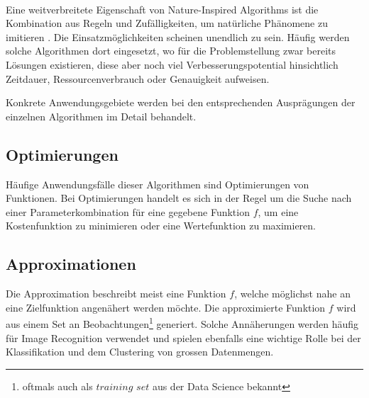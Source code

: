 \cite[Kap. 1.2]{Bro11} \\

Eine weitverbreitete Eigenschaft von Nature-Inspired Algorithms ist die Kombination aus Regeln und Zufälligkeiten, um
natürliche Phänomene zu imitieren \cite{NH15}. Die Einsatzmöglichkeiten scheinen unendlich zu sein. Häufig werden
solche Algorithmen dort eingesetzt, wo für die Problemstellung zwar bereits Lösungen existieren, diese aber noch viel
Verbesserungspotential hinsichtlich Zeitdauer, Ressourcenverbrauch oder Genauigkeit aufweisen.

Konkrete Anwendungsgebiete werden bei den entsprechenden Ausprägungen der einzelnen Algorithmen im Detail behandelt.


\subsection{Optimierungen}
Häufige Anwendungsfälle dieser Algorithmen sind Optimierungen von Funktionen. Bei Optimierungen
handelt es sich in der Regel um die Suche nach einer Parameterkombination für eine gegebene Funktion $f$, um eine
Kostenfunktion zu minimieren oder eine Wertefunktion zu maximieren.

\subsection{Approximationen}
Die Approximation beschreibt meist eine Funktion $f$, welche möglichst nahe an eine Zielfunktion angenähert werden
möchte. Die approximierte Funktion $f$ wird aus einem Set an Beobachtungen\footnote{oftmals auch als $training$ $set$ aus
der Data Science bekannt} generiert. Solche Annäherungen werden häufig für Image Recognition verwendet
und spielen ebenfalls eine wichtige Rolle bei der Klassifikation und dem Clustering von grossen Datenmengen.